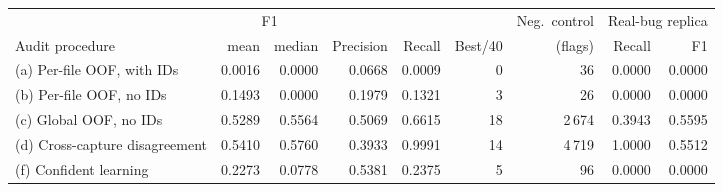 \begin{tabular}{l rr rr r r rr}
\toprule
& \multicolumn{2}{c}{F1} & & & & Neg.\ control & \multicolumn{2}{c}{Real-bug replica}\\
\cmidrule(lr){2-3}\cmidrule(lr){8-9}
Audit procedure & mean & median & Precision & Recall & Best/40 & (flags) & Recall & F1\\
\midrule
(a) Per-file OOF, with IDs & 0.0016 & 0.0000 & 0.0668 & 0.0009 & 0 & 36 & 0.0000 & 0.0000\\
(b) Per-file OOF, no IDs & 0.1493 & 0.0000 & 0.1979 & 0.1321 & 3 & 26 & 0.0000 & 0.0000\\
(c) Global OOF, no IDs & 0.5289 & 0.5564 & 0.5069 & 0.6615 & 18 & 2\,674 & 0.3943 & 0.5595\\
(d) Cross-capture disagreement & 0.5410 & 0.5760 & 0.3933 & 0.9991 & 14 & 4\,719 & 1.0000 & 0.5512\\
(f) Confident learning & 0.2273 & 0.0778 & 0.5381 & 0.2375 & 5 & 96 & 0.0000 & 0.0000\\
\bottomrule
\end{tabular}
